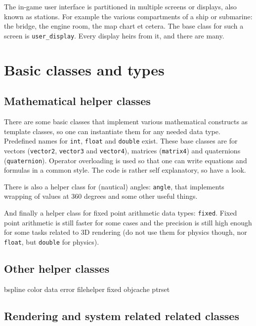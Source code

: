 \documentclass[english,a4paper,12pt]{report}
\begin{document}
The in-game user interface is partitioned in multiple screens or
displays, also known as stations. For example the various compartments
of a ship or submarine: the bridge, the engine room, the map chart et
cetera. The base class for such a screen is \texttt{user\_display}.
Every display heirs from it, and there are many.



\section{Basic classes and types}

\subsection{Mathematical helper classes}

There are some basic classes that implement various mathematical
constructs as template classes, so one can instantiate them for any
needed data type. Predefined names for \texttt{int}, \texttt{float} and
\texttt{double} exist. These base classes are for vectors
(\texttt{vector2}, \texttt{vector3} and \texttt{vector4}), matrices
(\texttt{matrix4}) and quaternions (\texttt{quaternion}). Operator
overloading is used so that one can write equations and formulas in a
common style. The code is rather self explanatory, so have a look.

There is also a helper class for (nautical) angles: \texttt{angle}, that
implements wrapping of values at 360 degrees and some other useful
things.

And finally a helper class for fixed point arithmetic data types:
\texttt{fixed}. Fixed point arithmetic is still faster for some cases
and the precision is still high enough for some tasks related to 3D
rendering (do not use them for physics though, nor \texttt{float}, but
\texttt{double} for physics).

\subsection{Other helper classes}
    
bspline color data error filehelper fixed objcache ptrset

\subsection{Rendering and system related related classes}
\end{document}
